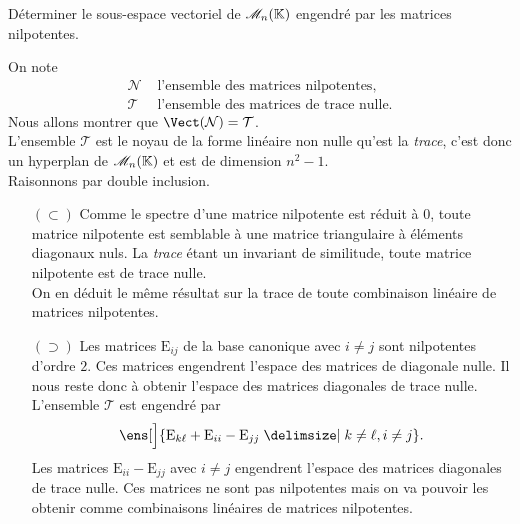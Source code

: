 \begin{exercice}
    Déterminer le sous-espace vectoriel de $\mathscr{M}_n(\mathbb{K})$ engendré par les matrices nilpotentes.
\end{exercice}

\begin{solution}
    On note 
    \begin{align*}
        \mathcal{N} & \text{ l'ensemble des matrices nilpotentes}, \\
        \mathcal{T} & \text{ l'ensemble des matrices de trace nulle.}
    \end{align*}
    Nous allons montrer que $\Vect(\mathcal{N}) = \mathcal{T}$. \\
    L'ensemble $\mathcal{T}$ est le noyau de la forme linéaire non nulle qu'est la \emph{trace}, c'est donc un hyperplan de $\mathscr{M}_n(\mathbb{K})$ et est de dimension $n^2-1$. \\
    Raisonnons par double inclusion.
    \begin{itemize}
        \item[$(\subset)$] Comme le spectre d'une matrice nilpotente est réduit à $0$, toute matrice nilpotente est semblable à une matrice triangulaire à éléments diagonaux nuls. La \emph{trace} étant un invariant de similitude, toute matrice nilpotente est de trace nulle. \\
        On en déduit le même résultat sur la trace de toute combinaison linéaire de matrices nilpotentes.
        \item[$(\supset)$] Les matrices $\mathrm{E}_{ij}$ de la base canonique avec $i \not= j$ sont nilpotentes d'ordre $2$. Ces matrices engendrent l'espace des matrices de diagonale nulle. Il nous reste donc à obtenir l'espace des matrices diagonales de trace nulle. L'ensemble $\mathcal{T}$ est engendré par
        $$\ens[\Big]{\mathrm{E}_{k \ell} + \mathrm{E}_{ii} - \mathrm{E}_{jj} \tq k \not= \ell, i \not= j }.$$
        Les matrices $\mathrm{E}_{ii} - \mathrm{E}_{jj}$ avec $i \not= j$ engendrent l'espace des matrices diagonales de trace nulle. Ces matrices ne sont pas nilpotentes mais on va pouvoir les obtenir comme combinaisons linéaires de matrices nilpotentes. \\

\end{itemize}
\end{solution}
